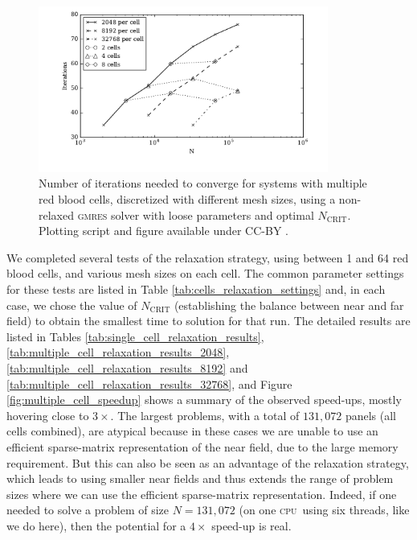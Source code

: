 \documentclass[final,3p,times]{elsarticle}
\newcommand{\cpu}{\textsc{cpu}}
\newcommand{\ncrit}{N_{\text{CRIT}}}
\newcommand{\gmres}{\textsc{gmres}\xspace}
\begin{document}
\begin{figure}
\begin{center}
	\includegraphics[natwidth=7in,natheight=3.5in,width=0.85\textwidth]{EthrocyteMultipleCellIterations.pdf}
	\caption{Number of iterations needed to converge for systems with multiple red blood cells, discretized with different mesh sizes, using a non-relaxed \gmres solver with loose parameters and optimal $\ncrit$. Plotting script and figure available under CC-BY \cite{WangLaytonBarba2016-figshare4}.}
	\label{fig:multiple_cell_iterations}
\end{center}
\end{figure}

We completed several tests of the relaxation strategy, using between 1 and 64 red blood cells, and various mesh sizes on each cell. The common parameter settings for these tests are listed in Table \ref{tab:cells_relaxation_settings} and, in each case, we chose the value of $\ncrit$ (establishing the balance between near and far field) to obtain the smallest time to solution for that run. The detailed results are listed in Tables \ref{tab:single_cell_relaxation_results}, \ref{tab:multiple_cell_relaxation_results_2048}, \ref{tab:multiple_cell_relaxation_results_8192} and \ref{tab:multiple_cell_relaxation_results_32768}, and Figure \ref{fig:multiple_cell_speedup} shows a summary of the observed speed-ups, mostly hovering close to $3\times$. The largest problems, with a total of $131,072$ panels (all cells combined), are atypical because in these cases we are unable to use an efficient sparse-matrix representation of the near field, due to the large memory requirement. But this can also be seen as an advantage of the relaxation strategy, which leads to using smaller near fields and thus extends the range of problem sizes where we can use the efficient sparse-matrix representation. Indeed, if one needed to solve a problem of size $N=131,072$ (on one \cpu\ using six threads, like we do here), then the potential for a $4\times$ speed-up is real.
\end{document}
